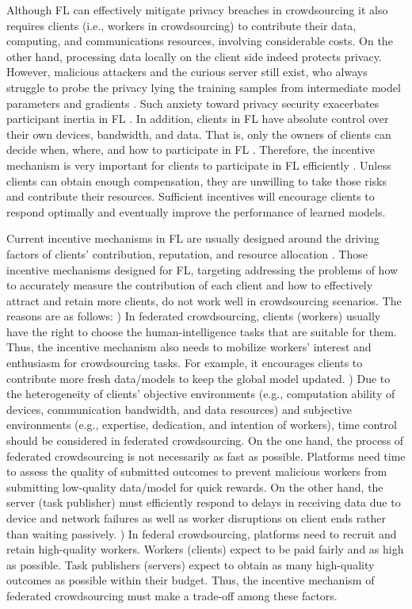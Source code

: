\documentclass[final,1p,times]{elsarticle}
\begin{document}
Although FL can effectively mitigate privacy breaches in crowdsourcing it also requires clients (i.e., workers in crowdsourcing) to contribute their data, computing, and communications resources, involving considerable costs. On the other hand, processing data locally on the client side indeed protects privacy. However, malicious attackers and the curious server still exist, who always struggle to probe the privacy lying the training samples from intermediate model parameters and gradients \citep{lyu2020threats,Song2020AnalyzingUP}. Such anxiety toward privacy security exacerbates participant inertia in FL \citep{mothukuri2021survey}. In addition, clients in FL have absolute control over their own devices, bandwidth, and data. That is, only the owners of clients can decide when, where, and how to participate in FL \citep{Liu2021FromDM}. Therefore, the incentive mechanism is very important for clients to participate in FL efficiently \citep{zhan2021incentive}. Unless clients can obtain enough compensation, they are unwilling to take those risks and contribute their resources. Sufficient incentives will encourage clients to respond optimally and eventually improve the performance of learned models.

Current incentive mechanisms in FL are usually designed around the driving factors of clients’ contribution, reputation, and resource allocation \citep{zhan2020learning,zhan2021survey}. Those incentive mechanisms designed for FL, targeting addressing the problems of how to accurately measure the contribution of each client and how to effectively attract and retain more clients, do not work well in crowdsourcing scenarios. The reasons are as follows: \lowercase{}) In federated crowdsourcing, clients (workers) usually have the right to choose the human-intelligence tasks that are suitable for them. Thus, the incentive mechanism also needs to mobilize workers' interest and enthusiasm for crowdsourcing tasks. For example, it encourages clients to contribute more fresh data/models to keep the global model updated. \lowercase{}) Due to the heterogeneity of clients' objective environments (e.g., computation ability of devices, communication bandwidth, and data resources) and subjective environments (e.g., expertise, dedication, and intention of workers), time control should be considered in federated crowdsourcing. On the one hand, the process of federated crowdsourcing is not necessarily as fast as possible. Platforms need time to assess the quality of submitted outcomes to prevent malicious workers from submitting low-quality data/model for quick rewards. On the other hand, the server (task publisher) must efficiently respond to delays in receiving data due to device and network failures as well as worker disruptions on client ends rather than waiting passively. \lowercase{}) In federal crowdsourcing, platforms need to recruit and retain high-quality workers. Workers (clients) expect to be paid fairly and as high as possible. Task publishers (servers) expect to obtain as many high-quality outcomes as possible within their budget. Thus, the incentive mechanism of federated crowdsourcing must make a trade-off among these factors.
\end{document}
